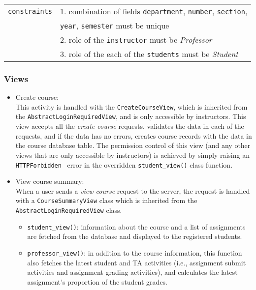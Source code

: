 \begin{table}[H]
\begin{tabular}[ht]{r|l}
        \texttt{constraints} & 
            1. combination of fields
                \texttt{department},
                \texttt{number},
                \texttt{section}, \\ &
                \hspace{1.3em}\texttt{year},
                \texttt{semester} must be unique \\
            & 2. role of the \texttt{instructor} must be \emph{Professor} \\
            & 3. role of the each of the \texttt{students} must be \emph{Student} \\
        \hline
    \end{tabular}
    \renewcommand{\arraystretch}{1}
    
\end{table}

\subsubsection{Views}

\begin{itemize}
    \label{item:NEW_COURSE}
    \item Create course: \\
        This activity is handled with the \texttt{CreateCourseView}, which is
        inherited from the \texttt{AbstractLoginRequiredView}, and is
        only accessible by instructors. 
        This view accepts all the \emph{create course} requests, validates the
        data in each of the requests, and if the data has no errors,
        creates course records with the data in the course database table.
        The permission control of this view
        (and any other views that are only accessible by instructors) is
        achieved by simply raising an \texttt{HTTPForbidden}~\citep[Section 6.5.3]{http}
        error in the overridden \texttt{student\_view()} class function.
    
    \item View course summary:\\
    When a user sends a \emph{view course} request to the server, the request
    is handled with a \texttt{CourseSummaryView} class which is inherited from
    the \texttt{AbstractLogin\-Required\-View} class.
    \begin{itemize}
        \item \texttt{student\_view()}: 
            information about the course and a list of assignments
            are fetched from the database and displayed to the registered
            students.
        \item \texttt{professor\_view()}:
            in addition to the course information,
            this function also fetches the latest student and TA activities 
            (i.e., assignment submit activities and  assignment grading
            activities),
            and calculates the latest assignment's proportion of the student
            grades.
    \end{itemize}
\end{itemize}

